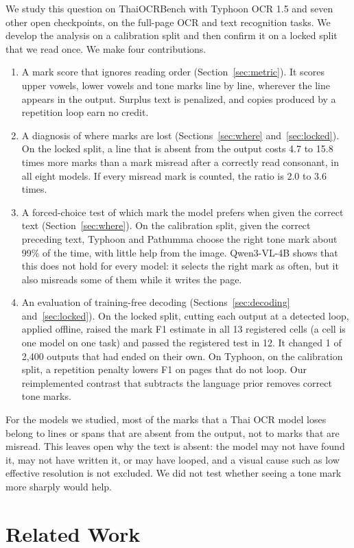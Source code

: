 We study this question on ThaiOCRBench with Typhoon OCR 1.5 and seven other open checkpoints, on the full-page OCR and text recognition tasks. We develop the analysis on a calibration split and then confirm it on a locked split that we read once. We make four contributions.
\begin{enumerate}
\item A mark score that ignores reading order (Section~\ref{sec:metric}). It scores upper vowels, lower vowels and tone marks line by line, wherever the line appears in the output. Surplus text is penalized, and copies produced by a repetition loop earn no credit.
\item A diagnosis of where marks are lost (Sections~\ref{sec:where} and~\ref{sec:locked}). On the locked split, a line that is absent from the output costs 4.7 to 15.8 times more marks than a mark misread after a correctly read consonant, in all eight models. If every misread mark is counted, the ratio is 2.0 to 3.6 times.
\item A forced-choice test of which mark the model prefers when given the correct text (Section~\ref{sec:where}). On the calibration split, given the correct preceding text, Typhoon and Pathumma choose the right tone mark about 99\% of the time, with little help from the image. Qwen3-VL-4B shows that this does not hold for every model: it selects the right mark as often, but it also misreads some of them while it writes the page.
\item An evaluation of training-free decoding (Sections~\ref{sec:decoding} and~\ref{sec:locked}). On the locked split, cutting each output at a detected loop, applied offline, raised the mark F1 estimate in all 13 registered cells (a cell is one model on one task) and passed the registered test in 12. It changed 1 of 2,400 outputs that had ended on their own. On Typhoon, on the calibration split, a repetition penalty lowers F1 on pages that do not loop. Our reimplemented contrast that subtracts the language prior removes correct tone marks.
\end{enumerate}
For the models we studied, most of the marks that a Thai OCR model loses belong to lines or spans that are absent from the output, not to marks that are misread. This leaves open why the text is absent: the model may not have found it, may not have written it, or may have looped, and a visual cause such as low effective resolution is not excluded. We did not test whether seeing a tone mark more sharply would help.

\section{Related Work}
